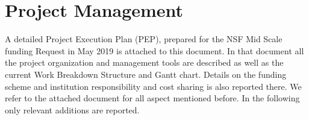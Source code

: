 \section{Project Management}
\label{sec:ProjectManagement}




A detailed Project Execution Plan (PEP), prepared for the NSF Mid Scale funding Request in May 2019 is attached to this document. In that document all the project organization and management tools are described as well as the current Work Breakdown Structure and Gantt chart. Details on the funding scheme and institution responsibility and cost sharing is also reported there. We refer to the attached document for all aspect mentioned before. In the following only relevant additions  are reported.

